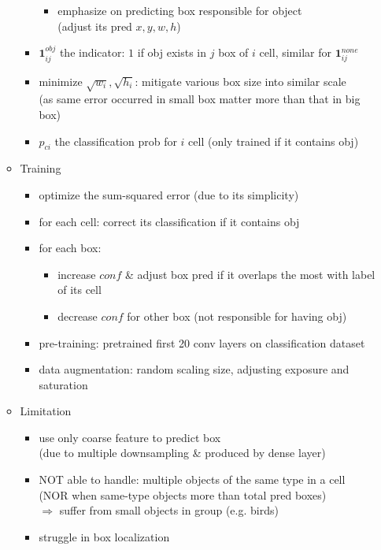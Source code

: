 \begin{itemize}
\begin{itemize}
\begin{itemize}
\begin{itemize}
			\item emphasize on predicting box responsible for object \\
			(adjust its pred $x,y,w,h$)
			\end{itemize}
		\item $\mathbf{1}^{obj}_{ij}$ the indicator: $1$ if obj exists in $j$ box of $i$ cell, similar for $\mathbf 1^{none}_{ij}$
		\item minimize $\sqrt{w_i}, \sqrt{h_i}$: mitigate various box size into similar scale \\ 
		(as same error occurred in small box matter more than that in big box)
		\item $p_{ci}$ the classification prob for $i$ cell (only trained if it contains obj)
		\end{itemize}
	\item Training
		\begin{itemize}
		\item optimize the sum-squared error (due to its simplicity)
		\item for each cell: correct its classification if it contains obj
		\item for each box:
			\begin{itemize}
			\item increase $conf$ \& adjust box pred if it overlaps the most with label of its cell
			\item decrease $conf$ for other box (not responsible for having obj)
			\end{itemize}
		\item pre-training: pretrained first 20 conv layers on classification dataset
		\item data augmentation: random scaling size, adjusting exposure and saturation
		\end{itemize}
	\item Limitation
		\begin{itemize}
		\item use only coarse feature to predict box \\ 
		(due to multiple downsampling \& produced by dense layer)
		\item NOT able to handle: multiple objects of the same type in a cell \\
		(NOR when same-type objects more than total pred boxes) \\
		$\Rightarrow$ suffer from small objects in group (e.g. birds)
		\item struggle in box localization
		\end{itemize}

\end{itemize}
\end{itemize}
